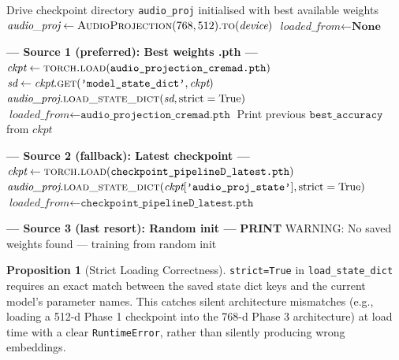 \documentclass[12pt,a4paper]{article}
\theoremstyle{definition}
\newtheorem{proposition}[theorem]{Proposition}
\theoremstyle{remark}
\begin{document}
\begin{algorithm}[H]
\caption{Priority Weight-Loading Chain}
\label{alg:load_weights}
\begin{algorithmic}[1]
\Require Drive checkpoint directory
\Ensure \texttt{audio\_proj} initialised with best available weights
\State $\textit{audio\_proj} \gets \textsc{AudioProjection}(768, 512).\textsc{to}(\textit{device})$
\State $\textit{loaded\_from} \gets \textbf{None}$

\State \textbf{--- Source 1 (preferred): Best weights .pth ---}
  \State $\textit{ckpt} \gets \textsc{torch.load}(\texttt{audio\_projection\_cremad.pth})$
  \State $\textit{sd} \gets \textit{ckpt}.\textsc{get}(\texttt{'model\_state\_dict'}, \textit{ckpt})$
  \State $\textit{audio\_proj}.\textsc{load\_state\_dict}(\textit{sd}, \text{strict}=\text{True})$
  \State $\textit{loaded\_from} \gets \texttt{audio\_projection\_cremad.pth}$
  \State Print previous $\texttt{best\_accuracy}$ from $\textit{ckpt}$
\EndIf

\State \textbf{--- Source 2 (fallback): Latest checkpoint ---}
  \State $\textit{ckpt} \gets \textsc{torch.load}(\texttt{checkpoint\_pipelineD\_latest.pth})$
  \State $\textit{audio\_proj}.\textsc{load\_state\_dict}(\textit{ckpt}[\texttt{'audio\_proj\_state'}], \text{strict}=\text{True})$
  \State $\textit{loaded\_from} \gets \texttt{checkpoint\_pipelineD\_latest.pth}$
\EndIf

\State \textbf{--- Source 3 (last resort): Random init ---}
  \State \textbf{PRINT} WARNING: No saved weights found — training from random init
\EndIf
\end{algorithmic}
\end{algorithm}

\begin{proposition}[Strict Loading Correctness]
\texttt{strict=True} in \texttt{load\_state\_dict} requires an exact match
between the saved state dict keys and the current model's parameter names.
This catches silent architecture mismatches (e.g., loading a 512-d Phase 1
checkpoint into the 768-d Phase 3 architecture) at load time with a clear
\texttt{RuntimeError}, rather than silently producing wrong embeddings.
\end{proposition}
\end{document}
